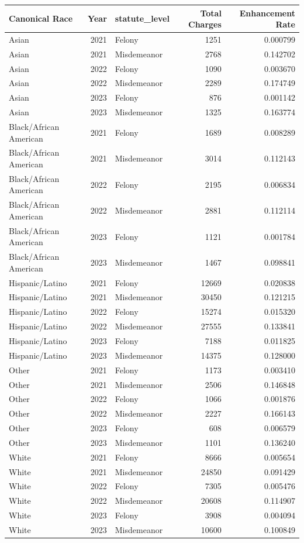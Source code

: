 \begin{tabular}{lrlrr}
\toprule
Canonical Race & Year & statute_level & Total Charges & Enhancement Rate \\
\midrule
Asian & 2021 & Felony & 1251 & 0.000799 \\
Asian & 2021 & Misdemeanor & 2768 & 0.142702 \\
Asian & 2022 & Felony & 1090 & 0.003670 \\
Asian & 2022 & Misdemeanor & 2289 & 0.174749 \\
Asian & 2023 & Felony & 876 & 0.001142 \\
Asian & 2023 & Misdemeanor & 1325 & 0.163774 \\
Black/African American & 2021 & Felony & 1689 & 0.008289 \\
Black/African American & 2021 & Misdemeanor & 3014 & 0.112143 \\
Black/African American & 2022 & Felony & 2195 & 0.006834 \\
Black/African American & 2022 & Misdemeanor & 2881 & 0.112114 \\
Black/African American & 2023 & Felony & 1121 & 0.001784 \\
Black/African American & 2023 & Misdemeanor & 1467 & 0.098841 \\
Hispanic/Latino & 2021 & Felony & 12669 & 0.020838 \\
Hispanic/Latino & 2021 & Misdemeanor & 30450 & 0.121215 \\
Hispanic/Latino & 2022 & Felony & 15274 & 0.015320 \\
Hispanic/Latino & 2022 & Misdemeanor & 27555 & 0.133841 \\
Hispanic/Latino & 2023 & Felony & 7188 & 0.011825 \\
Hispanic/Latino & 2023 & Misdemeanor & 14375 & 0.128000 \\
Other & 2021 & Felony & 1173 & 0.003410 \\
Other & 2021 & Misdemeanor & 2506 & 0.146848 \\
Other & 2022 & Felony & 1066 & 0.001876 \\
Other & 2022 & Misdemeanor & 2227 & 0.166143 \\
Other & 2023 & Felony & 608 & 0.006579 \\
Other & 2023 & Misdemeanor & 1101 & 0.136240 \\
White & 2021 & Felony & 8666 & 0.005654 \\
White & 2021 & Misdemeanor & 24850 & 0.091429 \\
White & 2022 & Felony & 7305 & 0.005476 \\
White & 2022 & Misdemeanor & 20608 & 0.114907 \\
White & 2023 & Felony & 3908 & 0.004094 \\
White & 2023 & Misdemeanor & 10600 & 0.100849 \\
\bottomrule
\end{tabular}

